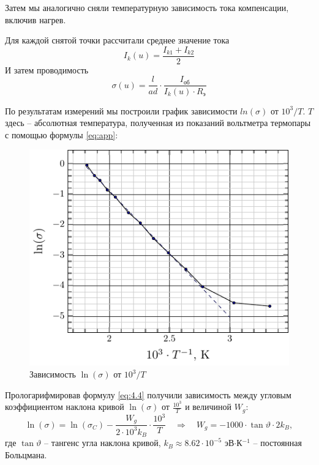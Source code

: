 \documentclass[a4paper,14pt]{extarticle}
\begin{document}
Затем мы аналогично сняли температурную зависимость тока компенсации, включив нагрев.

Для каждой снятой точки рассчитали среднее значение тока
\begin{equation}
	I_k(u)=\frac{I_{k1}+I_{k2}}{2}	
\end{equation}
И затем проводимость
\begin{equation}
	\sigma(u) = \frac{l}{ad}\cdot \frac{I_{\text{об}}}{ I_k(u) \cdot R_{\text{э}}}
\end{equation}

По результатам измерений мы построили график зависимости $ln(\sigma)$ от $10^3/T$. $T$ здесь – абсолютная температура, полученная из показаний вольтметра термопары с помощью формулы \eqref{eq:app}:

\begin{figure}[h!]
	\centering
	\includegraphics[scale=1.5]{plot/lnsigma_t}
	\caption{Зависимость $\ln(\sigma)$ от $10^3/T$}
	\label{fig:figure1}
\end{figure}


Прологарифмировав формулу \eqref{eq:4.4} получили зависимость между угловым коэффициентом наклона кривой
$\ln(\sigma)$ от $\frac{10^3}{T}$ и величиной $W_g$:
\begin{equation}
	\ln(\sigma) = \ln(\sigma_C) - \frac{W_g}{2\cdot10^3 k_B}\cdot\frac{10^3}{T}
	\quad \Rightarrow \quad
	 W_g = -1000 \cdot \tan\vartheta \cdot 2 k_B,
\end{equation}
где $\tan\vartheta$ -- тангенс угла наклона кривой, $k_B \approx 8.62 \cdot 10^{-5}$ эВ$\cdot$К$^{-1}$ -- постоянная Больцмана.
\end{document}
